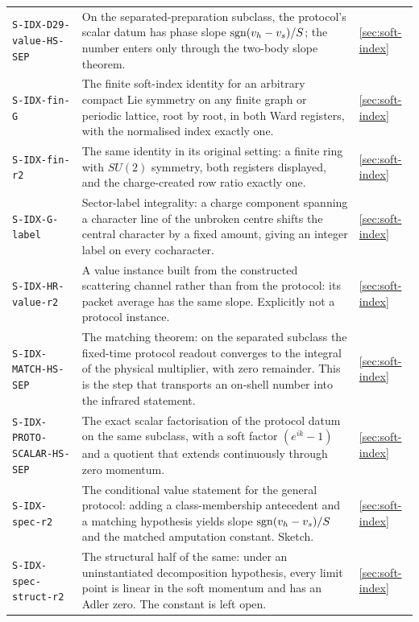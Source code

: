 {\begin{longtable}{@{}p{}p{}p{}@{}}
\texttt{S-IDX-D29-value-HS-SEP} & On the separated-preparation subclass, the
protocol's scalar datum has phase slope $\operatorname{sgn}(v_h-v_s)/S$; the number enters
only through the two-body slope theorem. & \cref{sec:soft-index}\\

\texttt{S-IDX-fin-G} & The finite soft-index identity for an arbitrary compact
Lie symmetry on any finite graph or periodic lattice, root by root, in both
Ward registers, with the normalised index exactly one. & \cref{sec:soft-index}\\

\texttt{S-IDX-fin-r2} & The same identity in its original setting: a finite
ring with $SU(2)$ symmetry, both registers displayed, and the charge-created
row ratio exactly one. & \cref{sec:soft-index}\\

\texttt{S-IDX-G-label} & Sector-label integrality: a charge component spanning
a character line of the unbroken centre shifts the central character by a
fixed amount, giving an integer label on every cocharacter. & \cref{sec:soft-index}\\

\texttt{S-IDX-HR-value-r2} & A value instance built from the constructed
scattering channel rather than from the protocol: its packet average has the
same slope. Explicitly not a protocol instance. & \cref{sec:soft-index}\\

\texttt{S-IDX-MATCH-HS-SEP} & The matching theorem: on the separated
subclass the fixed-time protocol readout converges to the integral of the
physical multiplier, with zero remainder. This is the step that transports an
on-shell number into the infrared statement. & \cref{sec:soft-index}\\

\texttt{S-IDX-PROTO-SCALAR-HS-SEP} & The exact scalar factorisation of the
protocol datum on the same subclass, with a soft factor $(e^{ik}-1)$ and a
quotient that extends continuously through zero momentum. & \cref{sec:soft-index}\\

\texttt{S-IDX-spec-r2} & The conditional value statement for the general
protocol: adding a class-membership antecedent and a matching hypothesis
yields slope $\operatorname{sgn}(v_h-v_s)/S$ and the matched amputation constant. Sketch. & \cref{sec:soft-index}\\

\texttt{S-IDX-spec-struct-r2} & The structural half of the same: under an
uninstantiated decomposition hypothesis, every limit point is linear in the
soft momentum and has an Adler zero. The constant is left open. & \cref{sec:soft-index}\\


\end{longtable}}
